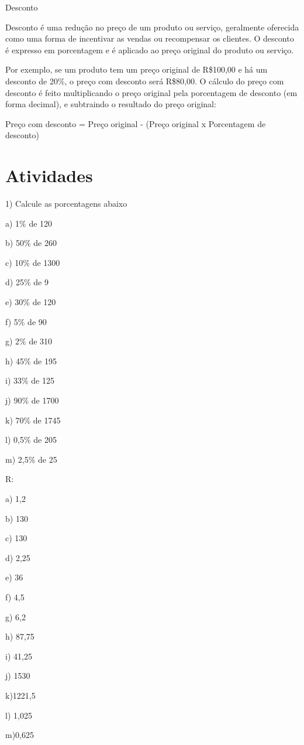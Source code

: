 Desconto

Desconto é uma redução no preço de um produto ou serviço, geralmente
oferecida como uma forma de incentivar as vendas ou recompensar os
clientes. O desconto é expresso em porcentagem e é aplicado ao preço
original do produto ou serviço.

Por exemplo, se um produto tem um preço original de R\$100,00 e há um
desconto de 20\%, o preço com desconto será R\$80,00. O cálculo do preço
com desconto é feito multiplicando o preço original pela porcentagem de
desconto (em forma decimal), e subtraindo o resultado do preço original:

Preço com desconto = Preço original - (Preço original x Porcentagem de
desconto)

\section{Atividades}

1) Calcule as porcentagens abaixo

a) 1\% de 120

b) 50\% de 260

c) 10\% de 1300

d) 25\% de 9

e) 30\% de 120

f) 5\% de 90

g) 2\% de 310

h) 45\% de 195

i) 33\% de 125

j) 90\% de 1700

k) 70\% de 1745

l) 0,5\% de 205

m) 2,5\% de 25

R:

a) 1,2

b) 130

c) 130

d) 2,25

e) 36

f) 4,5

g) 6,2

h) 87,75

i) 41,25

j) 1530

k)1221,5

l) 1,025

m)0,625

